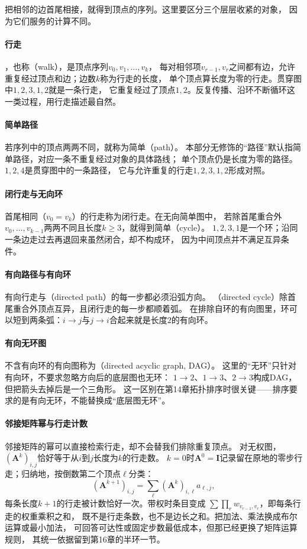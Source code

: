 把相邻的边首尾相接，就得到顶点的序列。这里要区分三个层层收紧的对象，
因为它们服务的计算不同。

\paragraph{行走}
，也称（walk），是顶点序列$v_0,v_1,\ldots,v_k$，
每对相邻项$v_{r-1},v_r$之间都有边，允许重复经过顶点和边；边数$k$称为行走的长度，
单个顶点算长度为零的行走。贯穿图中$1,2,3,1,2$就是一条行走，
它重复经过了顶点$1,2$。反复传播、沿环不断循环这一类过程，用行走描述最自然。

\paragraph{简单路径}
若序列中的顶点两两不同，就称为简单（path）。
本部分无修饰的“路径”默认指简单路径，对应一条不重复经过对象的具体路线；
单个顶点仍是长度为零的路径。$1,2,4$是贯穿图中的一条路径，
它与允许重复的行走$1,2,3,1,2$形成对照。

\paragraph{闭行走与无向环}
首尾相同（$v_0=v_k$）的行走称为闭行走。在无向简单图中，
若除首尾重合外$v_0,\ldots,v_{k-1}$两两不同且长度$k\geq3$，就得到简单（cycle）。
$1,2,3,1$是一个环；沿同一条边走过去再退回来虽然闭合，却不构成环，
因为中间顶点并不满足互异条件。

\paragraph{有向路径与有向环}
有向行走与（directed path）的每一步都必须沿弧方向。
（directed cycle）除首尾重合外顶点互异，且闭行走的每一步都顺着弧。
在排除自环的有向图里，环可以短到两条弧：$i\to j$与$j\to i$合起来就是长度$2$的有向环。

\paragraph{有向无环图}
不含有向环的有向图称为（directed acyclic graph, DAG）。
这里的“无环”只针对有向环，不要求忽略方向后的底层图也无环：
$1\to2$、$1\to3$、$2\to3$构成DAG，但把箭头去掉后是一个三角形。
这一区别在第14章拓扑排序时很关键——排序要求的是有向无环，不能替换成“底层图无环”。

\paragraph{邻接矩阵幂与行走计数}
邻接矩阵的幂可以直接检索行走，却不会替我们排除重复顶点。
对无权图，$(\bm A^k)_{i,j}$恰好等于从$i$到$j$长度为$k$的行走数。
$k=0$时$\bm A^0=\bm I$记录留在原地的零步行走；归纳地，按倒数第二个顶点$\ell$分类：
\[
  (\bm A^{k+1})_{i,j}=\sum_\ell(\bm A^k)_{i,\ell}a_{\ell,j},
\]
每条长度$k+1$的行走被计数恰好一次。带权时条目变成
$\sum\prod_r w_{v_{r-1},v_r}$，即每条行走的权重乘积之和，
既不是行走条数，也不是边长之和。把加法、乘法换成布尔运算或最小加法，
可回答可达性或固定步数最低成本，但那已经更换了矩阵运算规则，
其统一依据留到第16章的半环一节。

